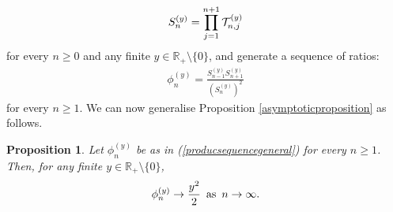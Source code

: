 \documentclass[a4paper,12pt]{article}
\newtheorem{prop}[thm]{Proposition}
\def\R{\mathbb{R}}
\def\T{\mathcal{T}}
\begin{document}
\begin{align}
S^{(y)}_n = \prod_{j=1}^{n+1} \T^{(y)}_{n,j} \notag 
\end{align}
for every $n\geq 0$ and any finite $y\in\R_+\setminus\{0\}$, and generate a sequence of ratios:
\begin{align}
\phi^{(y)}_n = \frac{S^{(y)}_{n-1}S^{(y)}_{n+1}}{(S^{(y)}_n)^2} \label{producsequencegeneral}
\end{align}
for every $n\geq 1$. We can now generalise Proposition \ref{asymptoticproposition} as follows.
\begin{prop}
\label{asymptitcgeneraltvalue}
Let $\phi^{(y)}_n$ be as in (\ref{producsequencegeneral}) for every $n\geq 1$. Then, for any finite $y\in\R_+\setminus\{0\}$,
\begin{align}
\phi^{(y)}_n \rightarrow \frac{y^2}{2} \,\,\, \text{as} \,\,\, n \rightarrow \infty. \notag
\end{align}
\end{prop}
\end{document}
